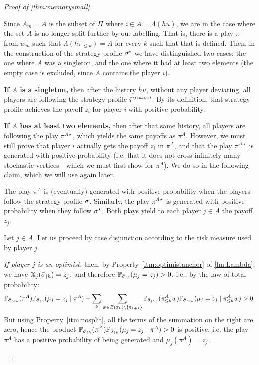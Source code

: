 \begin{proof}[Proof of \cref{thm:memorysmall}]
\begin{claimproof}
    Since $A_m= A$ is the  subset of $\Pi$ where $i\in A = \Lambda(hu)$, we are in the case where the set $A$ is no longer split further by our labelling. That is, there is a play $\pi$ from $w_m$ such that $\Lambda(h \pi_{\leq k}) = A$ for every $k$ such that that is defined.
    Then, in the construction of the strategy profile ${\bar{\sigma}}^\star$ we have distinguished two cases: the one where $A$ was a singleton, and the one where it had at least two elements (the empty case is excluded, since $A$ contains the player $i$).

    \textbf{If $A$ is a singleton,} then after the history $hu$, without any player deviating, all players are following the strategy profile $\btau^{\anch i}$.
    By its definition, that strategy profile achieves the payoff $z_i$ for player $i$ with positive probability.

    \textbf{If $A$ has at least two elements,} then after that same history, all players are following the play $\pi^{A\star}$, which yields the same payoffs as $\pi^A$.
    However, we must still prove that player $i$ actually gets the payoff $z_i$ in $\pi^A$, and that the play $\pi^{A\star}$ is generated with positive probability (i.e. that it does not cross infinitely many stochastic vertices---which we must first show for $\pi^A$).
We do so in the following claim, which we will use again later.

\begin{claim}\label{claim:piA}
    The play $\pi^A$ is (eventually) generated with positive probability when the players follow the strategy profile ${\bar{\sigma}}$.
    Similarly, the play $\pi^{A\star}$ is generated with positive probability when they follow ${\bar{\sigma}}^\star$.
    Both plays yield to each player $j \in A$ the payoff $z_j$.
\end{claim}

\begin{claimproof}
    Let $j \in A$.
    Let us proceed by case disjunction according to the risk measure used by player $j$.

\emph{If player $j$ is an optimist,} then, by Property~\ref{itm:optimistanchor} of \cref{lm:Lambda}, we have $\mathbb{X}_j({\bar{\sigma}}_{\upharpoonright h}) = z_j$, and therefore $\mathbb{P}_{{\bar{\sigma}}_{\upharpoonright h}}(\mu_j = z_j) > 0$, i.e., by the law of total probability:
        $$\mathbb{P}_{{\bar{\sigma}}_{\upharpoonright hu}}(\pi^A) \mathbb{P}_{{\bar{\sigma}}_{\upharpoonright h}}(\mu_j = z_j \mid \pi^A) + \sum_k \sum_{w \in E(\pi_k) \setminus \{\pi_{k+1}\}} \mathbb{P}_{{\bar{\sigma}}_{\upharpoonright hu}}(\pi^A_{\leq k} w) \mathbb{P}_{{\bar{\sigma}}_{\upharpoonright hu}}(\mu_j = z_j \mid \pi^A_{\leq k}w) > 0.$$
        But using Property~\ref{itm:nosplit}, all the terms of the summation on the right are zero, hence the product $\mathbb{P}_{{\bar{\sigma}}_{\upharpoonright h}}(\pi^A) \mathbb{P}_{{\bar{\sigma}}_{\upharpoonright h}}(\mu_j = z_j \mid \pi^A) > 0$ is positive, i.e. the play $\pi^A$ has  a positive probability of being generated and $\mu_j(\pi^A) = z_j$.


\end{claimproof}
\end{claimproof}
\end{proof}
